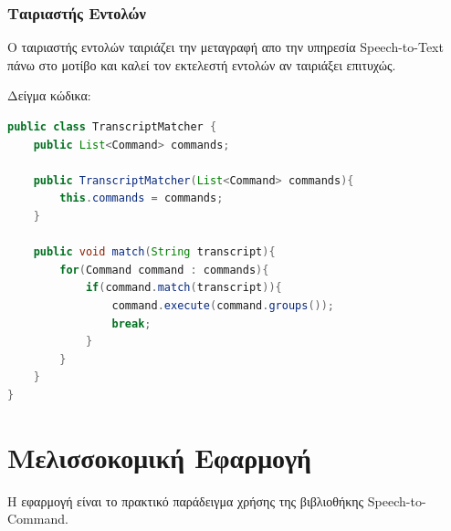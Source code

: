 \documentclass[oneside, 12pt]{book}
\begin{document}
\subsection{Ταιριαστής Εντολών}
Ο ταιριαστής εντολών ταιριάζει την μεταγραφή απο την υπηρεσία Speech-to-Text πάνω στο μοτίβο και καλεί τον εκτελεστή εντολών αν ταιριάξει επιτυχώς.
\begin{center}
	Δείγμα κώδικα:
	\begin{lstlisting}[language=java]
public class TranscriptMatcher {
    public List<Command> commands;

    public TranscriptMatcher(List<Command> commands){
        this.commands = commands;
    }

    public void match(String transcript){
        for(Command command : commands){
            if(command.match(transcript)){
                command.execute(command.groups());
                break;
            }
        }
    }
}
	\end{lstlisting}
\end{center}
\chapter{Μελισσοκομική Εφαρμογή}
Η εφαρμογή είναι το πρακτικό παράδειγμα χρήσης της βιβλιοθήκης Speech-to-Command.
\end{document}
